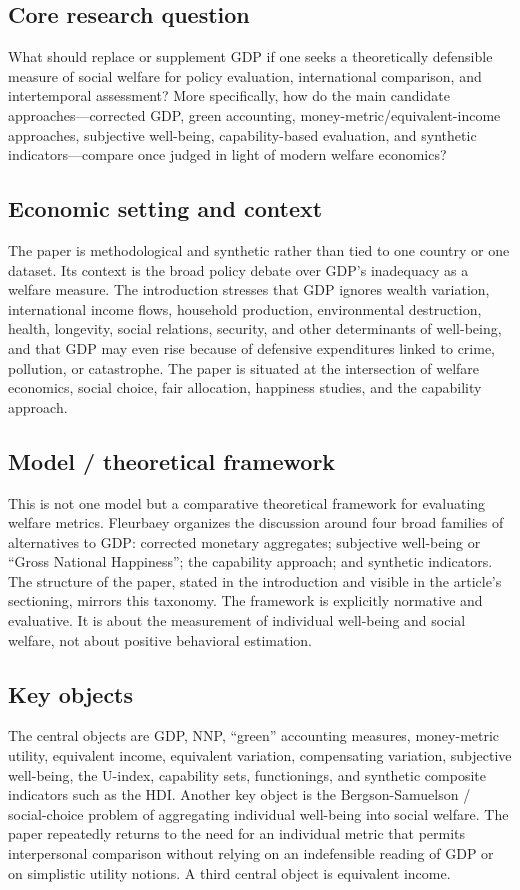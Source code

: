 \documentclass[11pt,a4paper]{article}
\begin{document}
\subsection*{Core research question}
What should replace or supplement GDP if one seeks a theoretically defensible measure of social welfare for policy evaluation, international comparison, and intertemporal assessment? More specifically, how do the main candidate approaches—corrected GDP, green accounting, money-metric/equivalent-income approaches, subjective well-being, capability-based evaluation, and synthetic indicators—compare once judged in light of modern welfare economics?

\subsection*{Economic setting and context}
The paper is methodological and synthetic rather than tied to one country or one dataset. Its context is the broad policy debate over GDP’s inadequacy as a welfare measure. The introduction stresses that GDP ignores wealth variation, international income flows, household production, environmental destruction, health, longevity, social relations, security, and other determinants of well-being, and that GDP may even rise because of defensive expenditures linked to crime, pollution, or catastrophe. The paper is situated at the intersection of welfare economics, social choice, fair allocation, happiness studies, and the capability approach.

\subsection*{Model / theoretical framework}
This is not one model but a comparative theoretical framework for evaluating welfare metrics. Fleurbaey organizes the discussion around four broad families of alternatives to GDP: corrected monetary aggregates; subjective well-being or “Gross National Happiness”; the capability approach; and synthetic indicators. The structure of the paper, stated in the introduction and visible in the article’s sectioning, mirrors this taxonomy. The framework is explicitly normative and evaluative. It is about the measurement of individual well-being and social welfare, not about positive behavioral estimation.

\subsection*{Key objects}
The central objects are GDP, NNP, “green” accounting measures, money-metric utility, equivalent income, equivalent variation, compensating variation, subjective well-being, the U-index, capability sets, functionings, and synthetic composite indicators such as the HDI. Another key object is the Bergson-Samuelson / social-choice problem of aggregating individual well-being into social welfare. The paper repeatedly returns to the need for an individual metric that permits interpersonal comparison without relying on an indefensible reading of GDP or on simplistic utility notions. A third central object is equivalent income.
\end{document}
